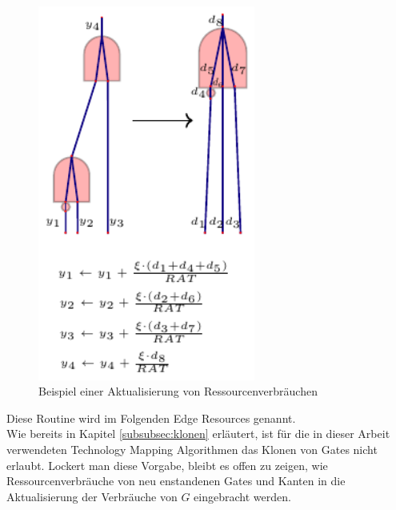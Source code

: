 \documentclass[11pt, a4paper, german]{article}
\newcommand{\TM}{Technology  Mapping }
\begin{document}
\begin{figure}[h]
\begin{center}
 \includegraphics[height = 350pt]{./pictures/compiled/RS_new_y}
 \caption{Beispiel einer Aktualisierung von Ressourcenverbräuchen}
 \label{bild:RS_new_y}
\end{center}
\end{figure}

Diese Routine wird im Folgenden Edge Resources genannt.\\
Wie bereits in Kapitel \ref{subsubsec:klonen} erläutert, ist für die in dieser Arbeit verwendeten \TM Algorithmen das Klonen von Gates nicht erlaubt. Lockert man diese Vorgabe, bleibt es offen zu zeigen, wie Ressourcenverbräuche von neu enstandenen Gates und Kanten in die Aktualisierung der Verbräuche von $G$ eingebracht werden. \\
\end{document}

